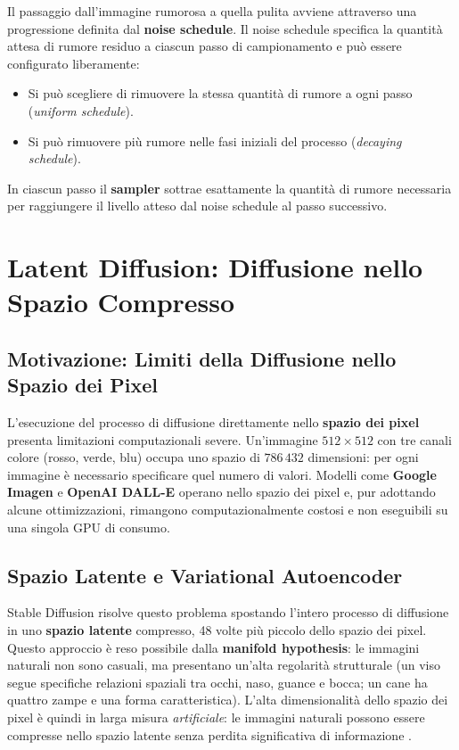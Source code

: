 Il passaggio dall'immagine rumorosa a quella pulita avviene attraverso
una progressione definita dal \textbf{noise schedule}. Il noise schedule
specifica la quantità attesa di rumore residuo a ciascun passo di
campionamento e può essere configurato liberamente:

\begin{itemize}
  \item Si può scegliere di rimuovere la stessa quantità di rumore
        a ogni passo (\emph{uniform schedule}).
  \item Si può rimuovere più rumore nelle fasi iniziali del processo
        (\emph{decaying schedule}).
\end{itemize}

In ciascun passo il \textbf{sampler} sottrae esattamente la quantità
di rumore necessaria per raggiungere il livello atteso dal noise schedule
al passo successivo.

\section{Latent Diffusion: Diffusione nello Spazio Compresso}
\label{sec:latent-diffusion}

\subsection{Motivazione: Limiti della Diffusione nello Spazio dei Pixel}
\label{subsec:pixel-space-limits}

L'esecuzione del processo di diffusione direttamente nello \textbf{spazio
dei pixel} presenta limitazioni computazionali severe. Un'immagine
$512 \times 512$ con tre canali colore (rosso, verde, blu) occupa uno
spazio di $786\,432$ dimensioni: per ogni immagine è necessario
specificare quel numero di valori. Modelli come \textbf{Google Imagen}
e \textbf{OpenAI DALL-E} operano nello spazio dei pixel e, pur
adottando alcune ottimizzazioni, rimangono computazionalmente costosi e
non eseguibili su una singola GPU di consumo.

\subsection{Spazio Latente e Variational Autoencoder}
\label{subsec:latent-space-vae}

Stable Diffusion risolve questo problema spostando l'intero processo di
diffusione in uno \textbf{spazio latente} compresso, 48 volte più piccolo
dello spazio dei pixel. Questo approccio è reso possibile dalla
\textbf{manifold hypothesis}: le immagini naturali non sono casuali,
ma presentano un'alta regolarità strutturale (un viso segue specifiche
relazioni spaziali tra occhi, naso, guance e bocca; un cane ha quattro
zampe e una forma caratteristica). L'alta dimensionalità dello spazio
dei pixel è quindi in larga misura \emph{artificiale}: le immagini
naturali possono essere compresse nello spazio latente senza perdita
significativa di informazione \citep{bishop2024}.


